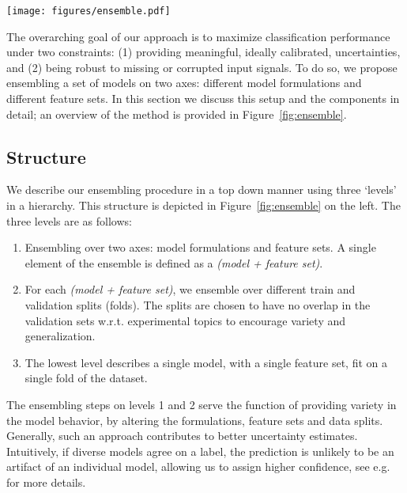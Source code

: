 \begin{figure*}[t]
\begin{center}\texttt{[image: figures/ensemble.pdf]}\end{center}
    \caption{An overview of the ensemble structure and prediction procedure. The structure is defined in a top-down fashion. First, we ensemble over different models and feature sets (level 1). Each \textit{(model + feature set)} combination consists of a small ensemble of models fit on different folds of the data (level 2). At the bottom, we consider individual models (level 3). Prediction is done in a bottom-up fashion. Individual models map the input signals to a prediction of being in L, D or H (level 3). These predictions are combined and re-scaled on the level of a \textit{(model + feature set)} (level 2). The resulting predictions are combined weighted by their confidences and a constant that is computed using a \textit{(model + feature set)}'s average classification performance, giving the full ensemble prediction (level 1).
    }\label{fig:ensemble}%
\end{figure*}


The overarching goal of our approach is to maximize classification performance under two constraints: (1) providing meaningful, ideally calibrated, uncertainties, and (2) being robust to missing or corrupted input signals. To do so, we propose ensembling a set of models on two axes: different model formulations and different feature sets. In this section we discuss this setup and the components in detail; an overview of the method is provided in Figure~\ref{fig:ensemble}.


\subsection{Structure}\label{ss:components}
We describe our ensembling procedure in a top down manner using three `levels' in a hierarchy. This structure is depicted in Figure~\ref{fig:ensemble} on the left. The three levels are as follows:
\begin{enumerate}[label=(\arabic*)]
    \item Ensembling over two axes: model formulations and feature sets. A single element of the ensemble is defined as a \textit{(model + feature set)}.
    \item For each \textit{(model + feature set)}, we ensemble over different train and validation splits (folds). The splits are chosen to have no overlap in the validation sets w.r.t. experimental topics to encourage variety and generalization. 
    \item The lowest level describes a single model, with a single feature set, fit on a single fold of the dataset.
\end{enumerate}
The ensembling steps on levels 1 and 2 serve the function of providing variety in the model behavior, by altering the formulations, feature sets and data splits. Generally, such an approach contributes to better uncertainty estimates. Intuitively, if diverse models agree on a label, the prediction is unlikely to be an artifact of an individual model, allowing us to assign higher confidence, see e.g.~\cite{lakshminarayanan2017,rahaman2021uncertainty} for more details.

